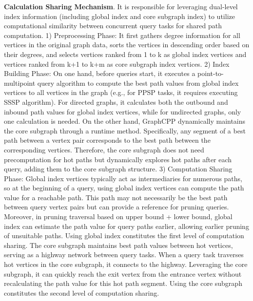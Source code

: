 \documentclass[lettersize,journal]{IEEEtran} %
\begin{document}
{\bf{Calculation Sharing Mechanism}}. It is responsible for leveraging dual-level index information (including global index and core subgraph index) to utilize computational similarity between concurrent query tasks for shared path computation. 1) Preprocessing Phase: It first gathers degree information for all vertices in the original graph data, sorts the vertices in descending order based on their degrees, and selects vertices ranked from 1 to k as global index vertices and vertices ranked from k+1 to k+m as core subgraph index vertices. 2) Index Building Phase: On one hand, before queries start, it executes a point-to-multipoint query algorithm to compute the best path values from global index vertices to all vertices in the graph (e.g., for PPSP tasks, it requires executing SSSP algorithm). For directed graphs, it calculates both the outbound and inbound path values for global index vertices, while for undirected graphs, only one calculation is needed. On the other hand, GraphCPP dynamically maintains the core subgraph through a runtime method. Specifically, any segment of a best path between a vertex pair corresponds to the best path between the corresponding vertices. Therefore, the core subgraph does not need precomputation for hot paths but dynamically explores hot paths after each query, adding them to the core subgraph structure. 3) Computation Sharing Phase: Global index vertices typically act as intermediaries for numerous paths, so at the beginning of a query, using global index vertices can compute the path value for a reachable path. This path may not necessarily be the best path between query vertex pairs but can provide a reference for pruning queries. Moreover, in pruning traversal based on upper bound + lower bound, global index can estimate the path value for query paths earlier, allowing earlier pruning of unsuitable paths. Using global index constitutes the first level of computation sharing. The core subgraph maintains best path values between hot vertices, serving as a highway network between query tasks. When a query task traverses hot vertices in the core subgraph, it connects to the highway. Leveraging the core subgraph, it can quickly reach the exit vertex from the entrance vertex without recalculating the path value for this hot path segment. Using the core subgraph constitutes the second level of computation sharing.
\end{document}
